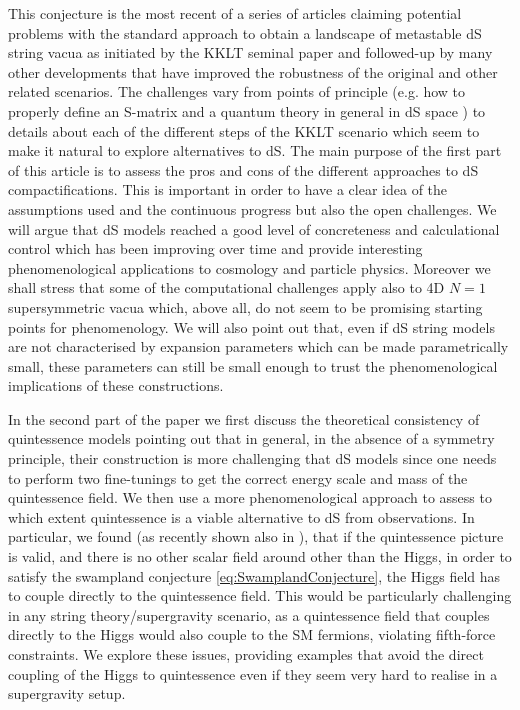 \documentclass[11pt,a4paper]{article}
\begin{document}
This conjecture is the most recent of a series of articles claiming potential problems with the standard approach to obtain a landscape of metastable dS string vacua as initiated by the KKLT seminal paper \cite{Kachru:2003aw} and followed-up by many other developments that have improved the robustness of the original and other related scenarios. The challenges vary from points of principle (e.g. how to properly define an S-matrix and a quantum theory in general in dS space \cite{Witten:2001kn, Banks:2012hx, Maltz:2016iaw}) to details about each of the different steps of the KKLT scenario \cite{Sethi:2017phn, Bena:2009xk, Moritz:2017xto} which seem to make it natural to explore alternatives to dS. The main purpose of the first part of this article is to assess the pros and cons of the different approaches to dS compactifications. This is important in order to have a clear idea of the assumptions used and the continuous progress but also the open challenges. We will argue that dS models reached a good level of concreteness and calculational control which has been improving over time and provide interesting phenomenological applications to cosmology and particle physics. Moreover we shall stress that some of the computational challenges apply also to 4D $N=1$ supersymmetric vacua which, above all, do not seem to be promising starting points for phenomenology. We will also point out that, even if dS string models are not characterised by expansion parameters which can be made parametrically small, these parameters can still be small enough to trust the phenomenological implications of these constructions.

In the second part of the paper we first discuss the theoretical consistency of quintessence models pointing out that in general, in the absence of a symmetry principle, their construction is more challenging that dS models since one needs to perform two fine-tunings to get the correct energy scale and mass of the quintessence field. We then use a more phenomenological approach to assess to which extent quintessence is a viable alternative to dS from observations. In particular, we found (as recently shown also in \cite{Denef:2018etk}), that if the quintessence picture is valid, and there is no other scalar field around other than the Higgs, in order to satisfy the swampland conjecture \eqref{eq:SwamplandConjecture}, the Higgs field has to couple directly to the quintessence field. This would be particularly challenging in any string theory/supergravity scenario, as a quintessence field that couples directly to the Higgs would also couple to the SM fermions, violating fifth-force constraints. We explore these issues, providing examples that avoid the direct coupling of the Higgs to quintessence even if they seem very hard to realise in a supergravity setup.
\end{document}
